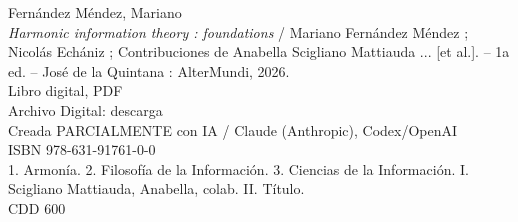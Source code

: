 \vspace{0.22em}
{\par}
{\scriptsize
Fern\'andez M\'endez, Mariano\\
\emph{Harmonic information theory : foundations} / Mariano Fern\'andez M\'endez ; Nicol\'as Ech\'aniz ; Contribuciones de Anabella Scigliano Mattiauda ... [et al.]. -- 1a ed. -- Jos\'e de la Quintana : AlterMundi, 2026.\\
Libro digital, PDF\\
Archivo Digital: descarga\\
Creada PARCIALMENTE con IA / Claude (Anthropic), Codex/OpenAI\\
ISBN 978-631-91761-0-0\\
1. Armon\'ia. 2. Filosof\'ia de la Informaci\'on. 3. Ciencias de la Informaci\'on. I. Scigliano Mattiauda, Anabella, colab. II. T\'itulo.\\
CDD 600\par}

\endgroup
